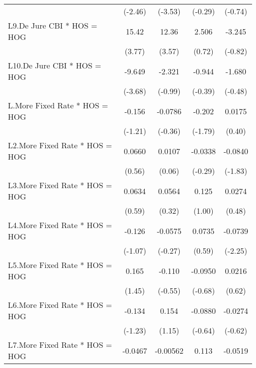 {\begin{longtable}{l*{4}{c}}
                &  (-2.46)         &  (-3.53)         &  (-0.29)         &  (-0.74)         \\
[1em]
L9.De Jure CBI * HOS = HOG&    15.42\sym{***}&    12.36\sym{***}&    2.506         &   -3.245         \\
                &   (3.77)         &   (3.57)         &   (0.72)         &  (-0.82)         \\
[1em]
L10.De Jure CBI * HOS = HOG&   -9.649\sym{***}&   -2.321         &   -0.944         &   -1.680         \\
                &  (-3.68)         &  (-0.99)         &  (-0.39)         &  (-0.48)         \\
[1em]
L.More Fixed Rate * HOS = HOG&   -0.156         &  -0.0786         &   -0.202         &   0.0175         \\
                &  (-1.21)         &  (-0.36)         &  (-1.79)         &   (0.40)         \\
[1em]
L2.More Fixed Rate * HOS = HOG&   0.0660         &   0.0107         &  -0.0338         &  -0.0840         \\
                &   (0.56)         &   (0.06)         &  (-0.29)         &  (-1.83)         \\
[1em]
L3.More Fixed Rate * HOS = HOG&   0.0634         &   0.0564         &    0.125         &   0.0274         \\
                &   (0.59)         &   (0.32)         &   (1.00)         &   (0.48)         \\
[1em]
L4.More Fixed Rate * HOS = HOG&   -0.126         &  -0.0575         &   0.0735         &  -0.0739\sym{*}  \\
                &  (-1.07)         &  (-0.27)         &   (0.59)         &  (-2.25)         \\
[1em]
L5.More Fixed Rate * HOS = HOG&    0.165         &   -0.110         &  -0.0950         &   0.0216         \\
                &   (1.45)         &  (-0.55)         &  (-0.68)         &   (0.62)         \\
[1em]
L6.More Fixed Rate * HOS = HOG&   -0.134         &    0.154         &  -0.0880         &  -0.0274         \\
                &  (-1.23)         &   (1.15)         &  (-0.64)         &  (-0.62)         \\
[1em]
L7.More Fixed Rate * HOS = HOG&  -0.0467         & -0.00562         &    0.113         &  -0.0519         \\

\end{longtable}}
